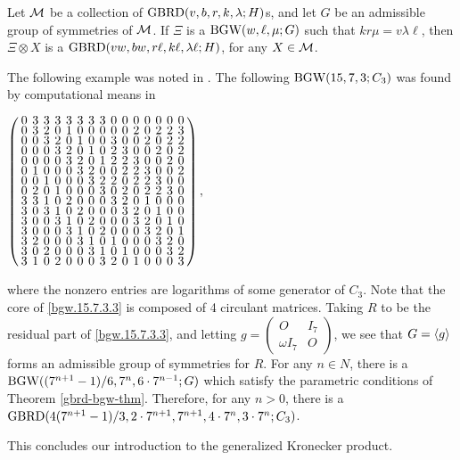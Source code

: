 \documentclass[../../../main]{subfiles}
\begin{document}
\begin{thm}\label{gbrd-bgw-thm}
 Let $\mathcal{M}$ be a collection of $\text{GBRD}(v,b,r,k,\lambda;H)$s, and let $G$ be an admissible group of symmetries of $\mathcal{M}$. If $\Xi$ is a $\text{BGW}(w,\ell,\mu;G)$ such that $kr\mu=v\lambda\ell$, then $\Xi \otimes X$ is a $\text{GBRD}(vw,bw,r\ell,k\ell,\lambda\ell;H)$, for any $X \in \mathcal{M}$.
\end{thm}

\begin{ex}
 The following example was noted in \cite{pender_2020}. The following $\text{BGW}(15,7,3;C_3)$ was found by computational means in \cite{mathon-signings}
 \begin{defenum}
  \item\label{bgw.15.7.3.3} $
  \arraycolsep=2.0pt\def\arraystretch{0.5}
  \left(\begin{array}{ccccccccccccccc}
0&3&3&3&3&3&3&3&0&0&0&0&0&0&0\\
0&3&2&0&1&0&0&0&0&0&2&0&2&2&3\\
0&0&3&2&0&1&0&0&3&0&0&2&0&2&2\\
0&0&0&3&2&0&1&0&2&3&0&0&2&0&2\\
0&0&0&0&3&2&0&1&2&2&3&0&0&2&0\\
0&1&0&0&0&3&2&0&0&2&2&3&0&0&2\\
0&0&1&0&0&0&3&2&2&0&2&2&3&0&0\\
0&2&0&1&0&0&0&3&0&2&0&2&2&3&0\\
3&3&1&0&2&0&0&0&3&2&0&1&0&0&0\\
3&0&3&1&0&2&0&0&0&3&2&0&1&0&0\\
3&0&0&3&1&0&2&0&0&0&3&2&0&1&0\\
3&0&0&0&3&1&0&2&0&0&0&3&2&0&1\\
3&2&0&0&0&3&1&0&1&0&0&0&3&2&0\\
3&0&2&0&0&0&3&1&0&1&0&0&0&3&2\\
3&1&0&2&0&0&0&3&2&0&1&0&0&0&3\\
  \end{array}\right),
   $
 \end{defenum}
 where the nonzero entries are logarithms of some generator of $C_3$. Note that
 the core of \ref{bgw.15.7.3.3} is composed of 4 circulant matrices. Taking $R$
 to be the residual part of \ref{bgw.15.7.3.3}, and letting
 $g=\left(\begin{smallmatrix} O & I_7 \\ \omega I_7 &
                                                      O \end{smallmatrix}\right)$, we see that $G=\langle g\rangle$ forms an admissible group of symmetries for $R$. For any $n \in N$, there is a $\text{BGW}((7^{n+1}-1)/6,7^n,6 \cdot 7^{n-1};G)$ which satisfy the parametric conditions of Theorem \ref{gbrd-bgw-thm}. Therefore, for any $n>0$, there is a $\text{GBRD}(4(7^{n+1}-1)/3,2\cdot 7^{n+1},7^{n+1},4 \cdot 7^n,3\cdot 7^n; C_3)$.
\end{ex}

This concludes our introduction to the generalized Kronecker product.
 
\biblio
\end{document}
